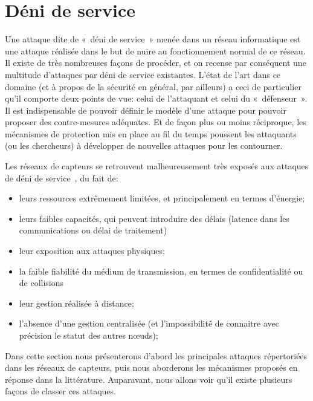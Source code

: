 \section{Déni de service}\label{ea:sec:dos}

Une attaque dite de « déni de service » menée dans un réseau informatique est une attaque réalisée dans le but de nuire au fonctionnement normal de ce réseau.
Il existe de très nombreuses façons de procéder, et on recense par conséquent une multitude d'attaques par déni de service existantes.
L'état de l'art dans ce domaine (et à propos de la sécurité en général, par ailleurs) a ceci de particulier qu'il comporte deux points de vue: celui de l'attaquant et celui du « défenseur ».
Il est indispensable de pouvoir définir le modèle d'une attaque pour pouvoir proposer des contre-mesures adéquates.
Et de façon plus ou moins réciproque, les mécanismes de protection mis en place au fil du temps poussent les attaquants (ou les chercheurs) à développer de nouvelles attaques pour les contourner.

Les réseaux de capteurs se retrouvent malheureusement très exposés aux attaques de déni de service~\cite{RM11}, du fait de:
\begin{itemize}
    \item leurs ressources extrêmement limitées, et principalement en termes d'énergie;
    \item leurs faibles capacités, qui peuvent introduire des délais (latence dans les communications ou délai de traitement)
    \item leur exposition aux attaques physiques;
    \item la faible fiabilité du médium de transmission, en termes de confidentialité ou de collisions
    \item leur gestion réalisée à distance;
    \item l'absence d'une gestion centralisée (et l'impossibilité de connaitre avec précision le statut des autres nœuds);
\end{itemize}

Dans cette section nous présenterons d'abord les principales attaques répertoriées dans les réseaux de capteurs, puis nous aborderons les mécanismes proposés en réponse dans la littérature.
Auparavant, nous allons voir qu'il existe plusieurs façons de classer ces attaques.










